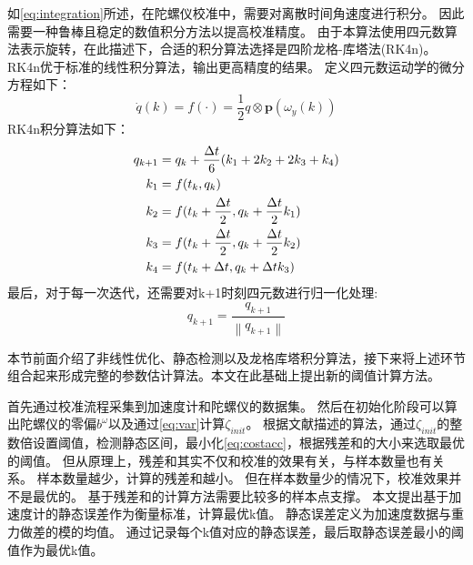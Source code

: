 \documentclass[
  type=master
]{gdutthesis}
\begin{document}
如\autoref{eq:integration}所述，在陀螺仪校准中，需要对离散时间角速度进行积分。
因此需要一种鲁棒且稳定的数值积分方法以提高校准精度。
由于本算法使用四元数算法表示旋转，在此描述下，合适的积分算法选择是四阶龙格-库塔法(RK4n)\cite{andrle2013geometric}。
RK4n优于标准的线性积分算法，输出更高精度的结果。
定义四元数运动学的微分方程如下：
\begin{equation}
	\dot{q}(k)=f(\cdot )=\frac{1}{2} q \otimes \mathbf{p}(\omega_y(k))
\end{equation}
RK4n积分算法如下：
\begin{equation}\label{eq:rk4}
	\begin{aligned}
		q_{k+1} &= q_k + \frac{\Delta t}{6}(k_1 + 2 k_2 + 2 k_3 + k_4)\\
		k_1 &= f(t_k , q_k)\\
		k_2 &= f(t_k + \frac{\Delta t}{2},q_k + \frac{\Delta t}{2} k_1)\\
		k_3 &= f(t_k + \frac{\Delta t}{2},q_k + \frac{\Delta t}{2} k_2)\\
		k_4 &= f(t_k + \Delta t, q_k + \Delta t k_3)\vspace{1ex}
	\end{aligned}
\end{equation}
最后，对于每一次迭代，还需要对k+1时刻四元数进行归一化处理:
\begin{equation}
	q_{k+1} = \frac{q_{k+1}}{\left\|q_{k+1}\right\|}
\end{equation}

本节前面介绍了非线性优化、静态检测以及龙格库塔积分算法，接下来将上述环节组合起来形成完整的参数估计算法。本文在此基础上提出新的阈值计算方法。

首先通过校准流程采集到加速度计和陀螺仪的数据集。
然后在初始化阶段可以算出陀螺仪的零偏$b^\omega$以及通过\autoref{eq:var}计算$\zeta_{init}$。
根据文献\parencite{tedaldi2014robust}描述的算法，通过$\zeta_{init}$的整数倍设置阈值，检测静态区间，最小化\autoref{eq:costacc}，根据残差和的大小来选取最优的阈值。
但从原理上，残差和其实不仅和校准的效果有关，与样本数量也有关系。
样本数量越少，计算的残差和越小。
但在样本数量少的情况下，校准效果并不是最优的。
基于残差和的计算方法需要比较多的样本点支撑。
本文提出基于加速度计的静态误差作为衡量标准，计算最优k值。
静态误差定义为加速度数据与重力做差的模的均值。
通过记录每个k值对应的静态误差，最后取静态误差最小的阈值作为最优k值。
\end{document}
